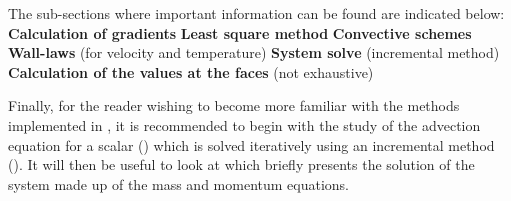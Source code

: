 The sub-sections where important information can be found are indicated
below:\newline
\newline
\nl \newline
\textbf{Calculation of gradients}\newline
\hspace*{1cm}\newline
\hspace*{1cm}\newline
\textbf{Least square method}\newline
\hspace*{1cm}\newline
\hspace*{1cm}\newline
\textbf{Convective schemes}\newline
\hspace*{1cm}\newline
\textbf{Wall-laws} (for velocity and temperature)\newline
\hspace*{1cm}\newline
\hspace*{1cm}\newline
\textbf{System solve} (incremental method)\newline
\hspace*{1cm}\newline
\textbf{Calculation of the values at the faces} (not exhaustive)\newline
\hspace*{1cm}\newline
\hspace*{1cm}\newline

Finally, for the reader wishing to become more familiar with the methods
implemented in \CS, it is recommended to begin with the study of the
advection equation for a scalar () which is solved iteratively
using an incremental method (). It will then be useful to look
at  which briefly presents the solution of the system made up
of the mass and momentum equations.

